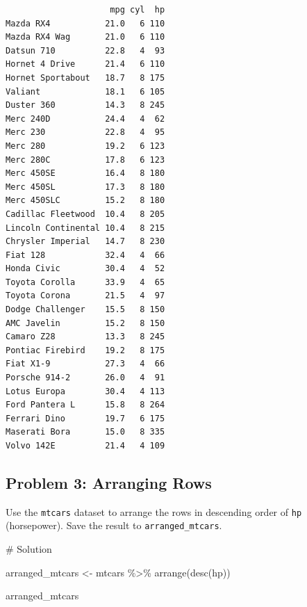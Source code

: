 \documentclass[
  letterpaper,
  DIV=11,
  numbers=noendperiod]{scrreprt}
\newenvironment{Shaded}{\begin{snugshade}}{\end{snugshade}}
\newcommand{\CommentTok}[1]{\textcolor[rgb]{0.37,0.37,0.37}{#1}}
\newcommand{\FunctionTok}[1]{\textcolor[rgb]{0.28,0.35,0.67}{#1}}
\newcommand{\NormalTok}[1]{\textcolor[rgb]{0.00,0.23,0.31}{#1}}
\newcommand{\OtherTok}[1]{\textcolor[rgb]{0.00,0.23,0.31}{#1}}
\newcommand{\SpecialCharTok}[1]{\textcolor[rgb]{0.37,0.37,0.37}{#1}}
\begin{document}
\begin{verbatim}
                     mpg cyl  hp
Mazda RX4           21.0   6 110
Mazda RX4 Wag       21.0   6 110
Datsun 710          22.8   4  93
Hornet 4 Drive      21.4   6 110
Hornet Sportabout   18.7   8 175
Valiant             18.1   6 105
Duster 360          14.3   8 245
Merc 240D           24.4   4  62
Merc 230            22.8   4  95
Merc 280            19.2   6 123
Merc 280C           17.8   6 123
Merc 450SE          16.4   8 180
Merc 450SL          17.3   8 180
Merc 450SLC         15.2   8 180
Cadillac Fleetwood  10.4   8 205
Lincoln Continental 10.4   8 215
Chrysler Imperial   14.7   8 230
Fiat 128            32.4   4  66
Honda Civic         30.4   4  52
Toyota Corolla      33.9   4  65
Toyota Corona       21.5   4  97
Dodge Challenger    15.5   8 150
AMC Javelin         15.2   8 150
Camaro Z28          13.3   8 245
Pontiac Firebird    19.2   8 175
Fiat X1-9           27.3   4  66
Porsche 914-2       26.0   4  91
Lotus Europa        30.4   4 113
Ford Pantera L      15.8   8 264
Ferrari Dino        19.7   6 175
Maserati Bora       15.0   8 335
Volvo 142E          21.4   4 109
\end{verbatim}

\subsection*{Problem 3: Arranging Rows}\label{problem-3-arranging-rows}

Use the \texttt{mtcars} dataset to arrange the rows in descending order
of \texttt{hp} (horsepower). Save the result to
\texttt{arranged\_mtcars}.

\begin{Shaded}
\begin{Highlighting}[]
\CommentTok{\# Solution}

\NormalTok{arranged\_mtcars }\OtherTok{\textless{}{-}}\NormalTok{ mtcars }\SpecialCharTok{\%\textgreater{}\%}
  \FunctionTok{arrange}\NormalTok{(}\FunctionTok{desc}\NormalTok{(hp))}

\NormalTok{arranged\_mtcars}
\end{Highlighting}
\end{Shaded}
\end{document}
